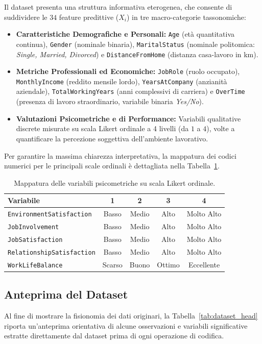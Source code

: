 \documentclass[11pt,a4paper]{article}
\begin{document}
Il dataset presenta una struttura informativa eterogenea, che consente di suddividere le $34$ feature predittive ($X_i$) in tre macro-categorie tassonomiche:
\begin{itemize}
    \item \textbf{Caratteristiche Demografiche e Personali:} \texttt{Age} (età quantitativa continua), \texttt{Gender} (nominale binaria), \texttt{MaritalStatus} (nominale politomica: \textit{Single, Married, Divorced}) e \texttt{DistanceFromHome} (distanza casa-lavoro in km).
    \item \textbf{Metriche Professionali ed Economiche:} \texttt{JobRole} (ruolo occupato), \texttt{MonthlyIncome} (reddito mensile lordo), \texttt{YearsAtCompany} (anzianità aziendale), \texttt{TotalWorkingYears} (anni complessivi di carriera) e \texttt{OverTime} (presenza di lavoro straordinario, variabile binaria \textit{Yes/No}).
    \item \textbf{Valutazioni Psicometriche e di Performance:} Variabili qualitative discrete misurate su scala Likert ordinale a 4 livelli (da $1$ a $4$), volte a quantificare la percezione soggettiva dell'ambiente lavorativo.
\end{itemize}

Per garantire la massima chiarezza interpretativa, la mappatura dei codici numerici per le principali scale ordinali è dettagliata nella Tabella~\ref{tab:scale_ordinali}.

\begin{table}[htbp]
\centering
\caption{Mappatura delle variabili psicometriche su scala Likert ordinale.}
\label{tab:scale_ordinali}
\begin{tabular}{lcccc}
\toprule
\textbf{Variabile} & \textbf{1} & \textbf{2} & \textbf{3} & \textbf{4} \\
\midrule
\texttt{EnvironmentSatisfaction} & Basso & Medio & Alto & Molto Alto \\
\texttt{JobInvolvement}          & Basso & Medio & Alto & Molto Alto \\
\texttt{JobSatisfaction}         & Basso & Medio & Alto & Molto Alto \\
\texttt{RelationshipSatisfaction}& Basso & Medio & Alto & Molto Alto \\
\texttt{WorkLifeBalance}         & Scarso & Buono & Ottimo & Eccellente \\
\bottomrule
\end{tabular}
\end{table}

\subsection{Anteprima del Dataset}
Al fine di mostrare la fisionomia dei dati originari, la Tabella~\ref{tab:dataset_head} riporta un'anteprima orientativa di alcune osservazioni e variabili significative estratte direttamente dal dataset prima di ogni operazione di codifica.
\end{document}
